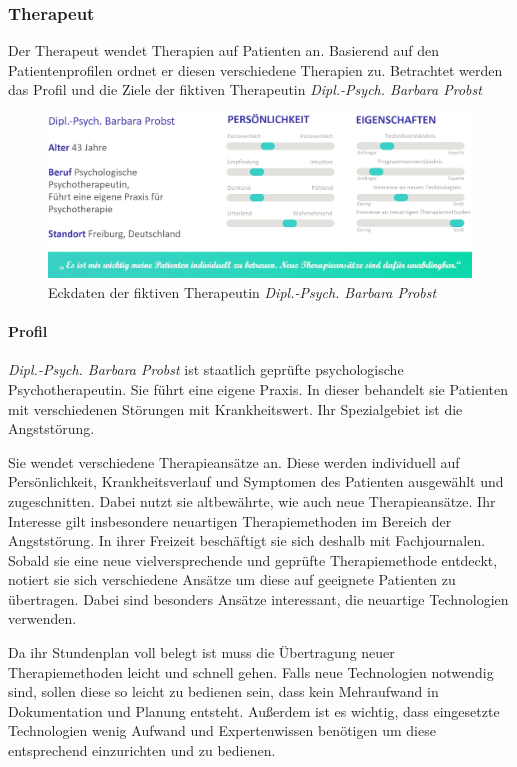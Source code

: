 \subsubsection{Therapeut}
Der Therapeut wendet Therapien auf Patienten an. Basierend auf den Patientenprofilen ordnet er diesen verschiedene Therapien zu. Betrachtet werden das Profil und die Ziele der fiktiven Therapeutin \emph{Dipl.-Psych. Barbara Probst}

\begin{figure}[h]
\centering
\includegraphics[width=1\textwidth]{pictures/therapeut}
\caption{Eckdaten der fiktiven Therapeutin \emph{Dipl.-Psych. Barbara Probst}}
\label{therapeut}
\end{figure}

\paragraph{Profil}
\emph{Dipl.-Psych. Barbara Probst} ist staatlich geprüfte psychologische Psychotherapeutin. Sie führt eine eigene Praxis. In dieser behandelt sie Patienten mit verschiedenen Störungen mit Krankheitswert. Ihr Spezialgebiet ist die Angststörung.

Sie wendet verschiedene Therapieansätze an. Diese werden individuell auf Persönlichkeit, Krankheitsverlauf und Symptomen des Patienten ausgewählt und zugeschnitten. Dabei nutzt sie altbewährte, wie auch neue Therapieansätze. Ihr Interesse gilt insbesondere neuartigen Therapiemethoden im Bereich der Angststörung. In ihrer Freizeit beschäftigt sie sich deshalb mit Fachjournalen. Sobald sie eine neue vielversprechende und geprüfte Therapiemethode entdeckt, notiert sie sich verschiedene Ansätze um diese auf geeignete Patienten zu übertragen. Dabei sind besonders Ansätze interessant, die neuartige Technologien verwenden.

Da ihr Stundenplan voll belegt ist muss die Übertragung neuer Therapiemethoden leicht und schnell gehen. Falls neue Technologien notwendig sind, sollen diese so leicht zu bedienen sein, dass kein Mehraufwand in Dokumentation und Planung entsteht. Außerdem ist es wichtig, dass eingesetzte Technologien wenig Aufwand und Expertenwissen benötigen um diese entsprechend einzurichten und zu bedienen.

